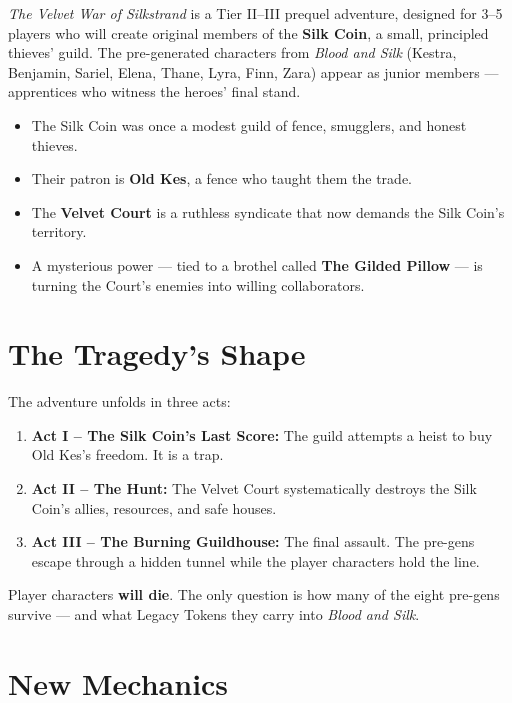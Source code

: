 \documentclass[10pt,twoside]{book}
\begin{document}
\textit{The Velvet War of Silkstrand} is a Tier II--III prequel adventure, designed for 3--5 players who will create original members of the \textbf{Silk Coin}, a small, principled thieves' guild. The pre-generated characters from \textit{Blood and Silk} (Kestra, Benjamin, Sariel, Elena, Thane, Lyra, Finn, Zara) appear as junior members --- apprentices who witness the heroes' final stand.

\begin{recapbox}
\begin{itemize}
\item The Silk Coin was once a modest guild of fence, smugglers, and honest thieves.
\item Their patron is \textbf{Old Kes}, a fence who taught them the trade.
\item The \textbf{Velvet Court} is a ruthless syndicate that now demands the Silk Coin's territory.
\item A mysterious power --- tied to a brothel called \textbf{The Gilded Pillow} --- is turning the Court's enemies into willing collaborators.
\end{itemize}
\end{recapbox}


\section{The Tragedy's Shape}

The adventure unfolds in three acts:

\begin{enumerate}
\item \textbf{Act I -- The Silk Coin's Last Score:} The guild attempts a heist to buy Old Kes's freedom. It is a trap.
\item \textbf{Act II -- The Hunt:} The Velvet Court systematically destroys the Silk Coin's allies, resources, and safe houses.
\item \textbf{Act III -- The Burning Guildhouse:} The final assault. The pre-gens escape through a hidden tunnel while the player characters hold the line.
\end{enumerate}

Player characters \textbf{will die}. The only question is how many of the eight pre-gens survive --- and what Legacy Tokens they carry into \textit{Blood and Silk}.

\section{New Mechanics}
\end{document}
